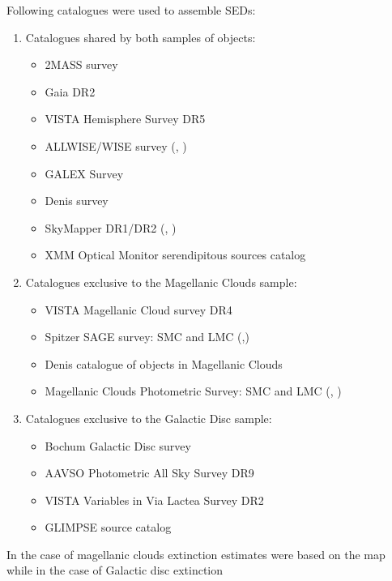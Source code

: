 \documentclass{pracalicmgr}
\begin{document}
Following catalogues were used to assemble SEDs:
\begin{enumerate}
\item Catalogues shared by both samples of objects:
\begin{itemize}
    \item 2MASS survey \citep{skrutskie_two_2006}
    \item Gaia DR2 \citep{gaia_collaboration_gaia_2018}
    \item VISTA Hemisphere Survey DR5 \citep{mcmahon_vizier_2021}
    \item ALLWISE/WISE survey (\citet*{wright_wide-field_2010}, \citet*{cutri_vizier_2021})
    \item GALEX Survey \citep{bianchi_galex_2011}
    \item Denis survey  \citep{denis_vizier_2005}
    \item SkyMapper DR1/DR2 (\citet*{wolf_skymapper_2018}, \citet*{onken_skymapper_2019})
    \item XMM Optical Monitor serendipitous sources catalog \citep{page_xmm-newton_2012}
\end{itemize}
\item Catalogues exclusive to the Magellanic Clouds sample:
\begin{itemize}
    \item VISTA Magellanic Cloud survey DR4 \citep{cioni_vizier_2017}
    \item Spitzer SAGE survey: SMC and LMC (\citet*{meixner_spitzer_2006},\citet*{gordon_surveying_2011})
    \item Denis catalogue of objects in Magellanic Clouds \citep{cioni_denis_2000}
    \item Magellanic Clouds Photometric Survey: SMC and LMC (\citet*{zaritsky_magellanic_2002}, \citet*{zaritsky_magellanic_2004})
\end{itemize}
\item Catalogues exclusive to the Galactic Disc sample:
\begin{itemize}
    \item Bochum Galactic Disc survey \citep{hackstein_bochum_2015}
    \item AAVSO Photometric All Sky Survey DR9 \citep{henden_apass_2015}
    \item VISTA Variables in Via Lactea Survey DR2 \citep{minniti_vizier_2017}
    \item GLIMPSE source catalog \citep{spitzer_science_vizier_2009}
\end{itemize} 
\end{enumerate} In the case of magellanic clouds extinction estimates were based on the map \citep{skowron_ogle-ing_2021} while in the case of Galactic disc extinction
\end{document}
